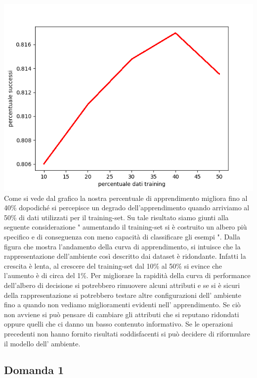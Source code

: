 		\includegraphics[scale=0.86]{performance.png}
		Come si vede dal grafico la nostra percentuale di apprendimento migliora fino al 40\% dopodiché si percepisce un degrado dell'apprendimento quando arriviamo al 50\% di dati utilizzati per il training-set.
		\newline
		 Su tale risultato siamo giunti alla seguente considerazione " aumentando il training-set si è costruito un albero più specifico e di conseguenza  con meno capacità di classificare gli esempi ".
		 Dalla figura che mostra l'andamento della curva di apprendimento, si intuisce che la rappresentazione dell'ambiente così descritto dai dataset è ridondante.
		  Infatti la crescita è lenta, al crescere del training-set dal 10\% al 50\% si evince che l'aumento è di circa del 1\%.
		  Per migliorare la rapidità della curva di performance dell'albero di decisione si potrebbero rimuovere alcuni attributi e se si è sicuri della rappresentazione si potrebbero testare altre configurazioni dell' ambiente fino a quando non vediamo miglioramenti evidenti nell' apprendimento. Se ciò non avviene si può pensare di cambiare gli attributi che si reputano ridondati oppure quelli che ci danno un basso contenuto informativo.
		  Se le operazioni precedenti non hanno fornito risultati soddisfacenti si può decidere di riformulare il modello dell' ambiente. 
		\subsection{Domanda 1}
		
